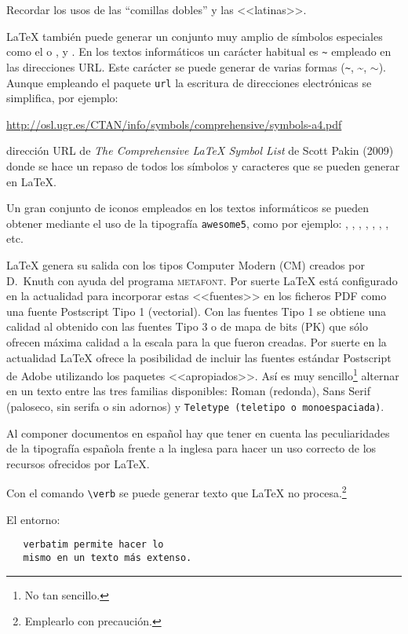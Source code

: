 Recordar los usos de las ``comillas dobles'' y las <<latinas>>.

\LaTeX{} también puede generar un conjunto muy amplio de símbolos especiales como el \EUR{} o \texteuro,  y \Coffeecup. En los textos informáticos un carácter habitual es \verb+~+ empleado en las direcciones URL. Este carácter se puede generar de varias formas (\verb+~+, \~{}, $\sim$). Aunque empleando el paquete \texttt{url} la escritura de direcciones electrónicas se simplifica, por ejemplo:

\url{http://osl.ugr.es/CTAN/info/symbols/comprehensive/symbols-a4.pdf}

\noindent dirección URL de \emph{The Comprehensive \LaTeX{} Symbol List} de Scott Pakin (2009) donde se hace un repaso de todos los símbolos y caracteres que se pueden generar en \LaTeX{}.

Un gran conjunto de iconos empleados en los textos informáticos se pueden obtener mediante el uso de la tipografía \texttt{awesome5}, como por ejemplo: \faNodeJs, \faNode, \faGooglePlay, \faInternetExplorer, \faGithub, \faGit*, \faWhatsapp, etc.

\LaTeX{} genera su salida con los tipos Computer Modern (CM) creados por D.~Knuth con ayuda del programa \textsc{metafont}. Por suerte \LaTeX{} está configurado en la actualidad para incorporar estas <<fuentes>> en los ficheros PDF como una fuente Postscript Tipo 1 (vectorial). Con las fuentes Tipo 1 se obtiene una calidad al obtenido con las fuentes Tipo 3 o de mapa de bits (PK) que sólo ofrecen máxima calidad a la escala para la que fueron creadas. Por suerte en la actualidad \LaTeX{} ofrece la posibilidad de incluir las fuentes estándar Postscript de Adobe utilizando los paquetes <<apropiados>>. Así es muy sencillo\footnote{No tan sencillo.} alternar en un texto entre las tres familias disponibles: Roman (redonda), \textsf{Sans Serif (paloseco, sin serifa o sin adornos)} y \texttt{Teletype (teletipo o monoespaciada)}. 

Al componer documentos en español hay que tener en cuenta las peculiaridades de la tipografía española frente a la inglesa para hacer un uso correcto de los recursos ofrecidos por \LaTeX.

\noindent Con el comando \verb+\verb+ se puede generar texto que \LaTeX{} no procesa.\footnote{Emplearlo con precaución.}



El entorno:
\begin{verbatim}
   verbatim permite hacer lo 
   mismo en un texto más extenso.
\end{verbatim} 

